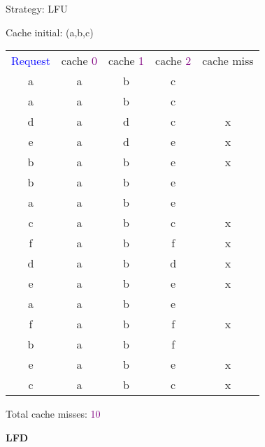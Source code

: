 \begin{tcolorbox}
{
Strategy: LFU

\vspace{\baselineskip}

Cache initial: (a,b,c)

\vspace{\baselineskip}
\begin{tabular}{*{5}{c}}
\textcolor{Blue}{Request} & cache \textcolor{Purple}{0} & cache \textcolor{Purple}{1} & cache \textcolor{Purple}{2} & cache miss \\
a & a & b & c & \ \\
a & a & b & c & \ \\
d & a & d & c & x \\
e & a & d & e & x \\
b & a & b & e & x \\
b & a & b & e & \ \\
a & a & b & e & \ \\
c & a & b & c & x \\
f & a & b & f & x \\
d & a & b & d & x \\
e & a & b & e & x \\
a & a & b & e & \ \\
f & a & b & f & x \\
b & a & b & f & \ \\
e & a & b & e & x \\
c & a & b & c & x \\
\end{tabular}

\vspace{\baselineskip}

Total cache misses: \textcolor{Purple}{10}}
\end{tcolorbox}

\textbf{LFD}


